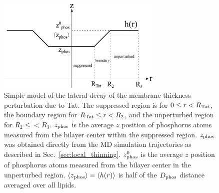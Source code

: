 \begin{figure}[htbp]
  \centering
  \includegraphics[width=0.7\textwidth]{./figures/Tat/MMs/linear_model}
  \caption{Simple model of the lateral decay of the membrane thickness 
  perturbation due to Tat. The suppressed region is for $0 \leq r < R_\textrm{Tat}$,
  the boundary region for $R_\textrm{Tat} \leq r < R_2$, and the unperturbed
  region for $R_2 \leq < R_3$. $z_\textrm{phos}$ is the average $z$ position of
  phosphorus atoms measured from the bilayer center within the suppressed region.
  $z_\textrm{phos}$ was obtained directly from the MD simulation trajectories as described in 
  Sec.~\ref{sec:local_thinning}. $z_\textrm{phos}^0$ is the average $z$ position of 
  phosphorus atoms measured from the bilayer center in the unperturbed region.
  $\langle z_\textrm{phos}\rangle = \langle h(r)\rangle$ is half of the
  $D_\text{phos}$ distance averaged over all lipids.}
  \label{fig:linear_model}
\end{figure}

